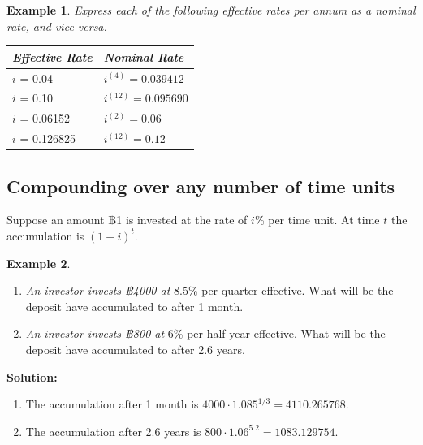 \documentclass[
]{book}
\theoremstyle{definition}
\theoremstyle{definition}
\newtheorem{example}{Example}[chapter]
\theoremstyle{definition}
\theoremstyle{definition}
\theoremstyle{remark}
\begin{document}
\begin{example}

\emph{Express each of the following effective rates per annum as a nominal
rate, and vice versa.}

\begin{longtable}[]{@{}ll@{}}
\toprule\noalign{}
\textbf{\emph{Effective Rate}} & \textbf{\emph{Nominal Rate}} \\
\midrule\noalign{}
\endhead
\bottomrule\noalign{}
\endlastfoot
\(i\) = 0.04 & \(i^{(4)} = 0.039412\) \\
\(i\) = 0.10 & \(i^{(12)} = 0.095690\) \\
\(i\) = 0.06152 & \(i^{(2)} = 0.06\) \\
\(i\) = 0.126825 & \(i^{(12)} = 0.12\) \\
\end{longtable}

\end{example}

\subsection{Compounding over any number of time units}\label{compounding-over-any-number-of-time-units}

Suppose an amount ฿1 is invested at the rate of \(i\)\% per time unit. At
time \(t\) the accumulation is \((1 + i)^t\).

\begin{example}
\leavevmode

\begin{enumerate}
\def\labelenumi{\arabic{enumi}.}
\item
  \emph{An investor invests ฿4000 at} \(8.5\)\% per quarter effective. What
  will be the deposit have accumulated to after 1 month.
\item
  \emph{An investor invests ฿800 at} \(6\)\% per half-year effective. What
  will be the deposit have accumulated to after 2.6 years.
\end{enumerate}

\end{example}

\textbf{Solution:}

\begin{enumerate}
\def\labelenumi{\arabic{enumi}.}
\item
  The accumulation after 1 month is
  \(4000 \cdot 1.085^{1/3} = 4110.265768.\)
\item
  The accumulation after 2.6 years is
  \(800 \cdot 1.06^{5.2} = 1083.129754.\)
\end{enumerate}
\end{document}
